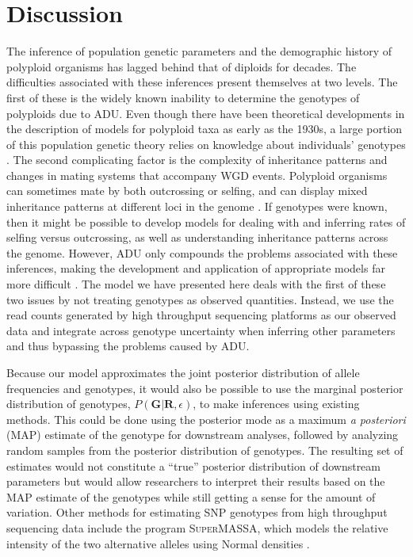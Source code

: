 \documentclass[11pt,english,letterpaper,oneside]{article}
\begin{document}
\section*{Discussion}         %

The inference of population genetic parameters and the demographic history of polyploid organisms has lagged behind that of diploids for decades. The difficulties associated with these inferences present themselves at two levels. The first of these is the widely known inability to determine the genotypes of polyploids due to ADU. Even though there have been theoretical developments in the description of models for polyploid taxa as early as the 1930s, a large portion of this population genetic theory relies on knowledge about individuals' genotypes \citep[e.g.,][]{haldane1930autopolyploids,wright1938polyploid}. The second complicating factor is the complexity of inheritance patterns and changes in mating systems that accompany WGD events. Polyploid organisms can sometimes mate by both outcrossing or selfing, and can display mixed inheritance patterns at different loci in the genome \citep{dufresne2014polyPopGen}. If genotypes were known, then it might be possible to develop models for dealing with and inferring rates of selfing versus outcrossing, as well as understanding inheritance patterns across the genome. However, ADU only compounds the problems associated with these inferences, making the development and application of appropriate models far more difficult \citep[but see list of software in][]{dufresne2014polyPopGen}. The model we have presented here deals with the first of these two issues by not treating genotypes as observed quantities. Instead, we use the read counts generated by high throughput sequencing platforms as our observed data and integrate across genotype uncertainty when inferring other parameters and thus bypassing the problems caused by ADU.
\medskip

Because our model approximates the joint posterior distribution of allele frequencies and genotypes, it would also be possible to use the marginal posterior distribution of genotypes, $P(\bm{G}|\bm{R},\epsilon)$, to make inferences using existing methods. This could be done using the posterior mode as a maximum \textit{a posteriori} (MAP) estimate of the genotype for downstream analyses, followed by analyzing random samples from the posterior distribution of genotypes. The resulting set of estimates would not constitute a ``true'' posterior distribution of downstream parameters but would allow researchers to interpret their results based on the MAP estimate of the genotypes while still getting a sense for the amount of variation. Other methods for estimating SNP genotypes from high throughput sequencing data include the program \textsc{SuperMASSA}, which models the relative intensity of the two alternative alleles using Normal densities \citep{serang2012supermassa}. 
\end{document}
